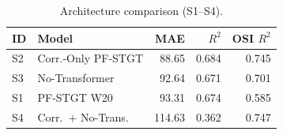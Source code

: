 \begin{table}[!t]
\caption{Architecture comparison (S1--S4).}
\label{tab:6}
\centering
\scriptsize
\renewcommand{\arraystretch}{1.15}
\begin{tabular}{|l|l|r|r|r|}
\hline
\textbf{ID} & \textbf{Model} & \textbf{MAE} & \textbf{$R^2$} & \textbf{OSI $R^2$} \\
\hline
S2 & Corr.-Only PF-STGT & 88.65 & 0.684 & 0.745 \\
S3 & No-Transformer & 92.64 & 0.671 & 0.701 \\
S1 & PF-STGT W20 & 93.31 & 0.674 & 0.585 \\
S4 & Corr.\ + No-Trans. & 114.63 & 0.362 & 0.747 \\
\hline
\end{tabular}
\end{table}
